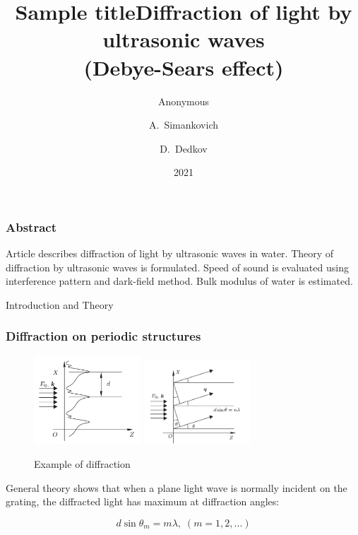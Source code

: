 \documentclass{beamer}
\title{Sample title}
\author{Anonymous}
\institute{Overleaf}
\date{2021}
\title[About Beamer] %
{Diffraction of light by ultrasonic waves \\ (Debye-Sears effect)}
\author[Arthur, Doe] %
{A.~Simankovich \and D.~Dedkov }
\institute[VFU] %
{
	Moscow Institute of Physics and Technology
}
\date[VLC 2023] %
\begin{document}
	
	\frame{\titlepage}
	
	\begin{frame}
		\frametitle{Abstract}
		Article describes diffraction of light by ultrasonic waves in water. Theory of diffraction by ultrasonic waves is formulated. Speed of sound is evaluated using interference pattern and dark-field method. Bulk modulus of water is estimated.
		
	\end{frame}
	
		\begin{frame}[plain,c]
		
		\begin{center}
			\huge {} Introduction and Theory
		\end{center}
		
	\end{frame}
		
	
	\begin{frame}
		\frametitle{Diffraction on periodic structures}
		
		\begin{figure}
			\centering
			\includegraphics[width=4cm]{res/periodic.png}
			\includegraphics[width=4cm]{res/diffraction_general.png}
			\caption{Example of diffraction}
		\end{figure}
		
		
		General theory shows that when a plane light wave is normally incident on the grating, the diffracted light has maximum at diffraction angles:

		$$d \sin{\theta_m} = m \lambda,\; (m = 1, 2, ...)$$
		
	\end{frame}
\end{document}
